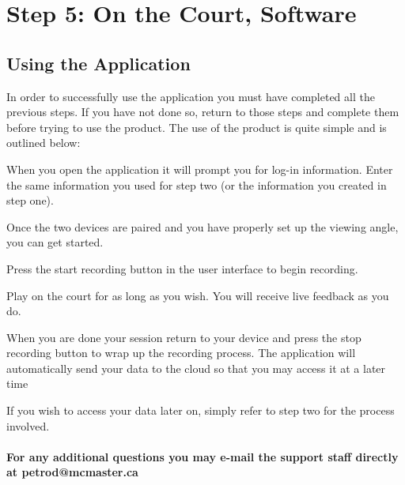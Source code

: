 \chapter{Step 5: On the Court, Software}

\setlength{\parindent}{0cm}

\section{Using the Application}
In order to successfully use the application you must have completed all the previous steps. If you have not done so, return to those steps and complete them before trying to use the product. The use of the product is quite simple and is outlined below:

\begin{enumerate}[{[1]}]
    \item When you open the application it will prompt you for log-in information. Enter the same information you used for step two (or the information you created in step one).
    \item Once the two devices are paired and you have properly set up the viewing angle, you can get started.
    \item Press the start recording button in the user interface to begin recording.
    \item Play on the court for as long as you wish. You will receive live feedback as you do.
    \item When you are done your session return to your device and press the stop recording button to wrap up the recording process. The application will automatically send your data to the cloud so that you may access it at a later time
\end{enumerate}

If you wish to access your data later on, simply refer to step two for the process involved.\\ \\\textbf{For any additional questions you may e-mail the support staff directly at petrod@mcmaster.ca}